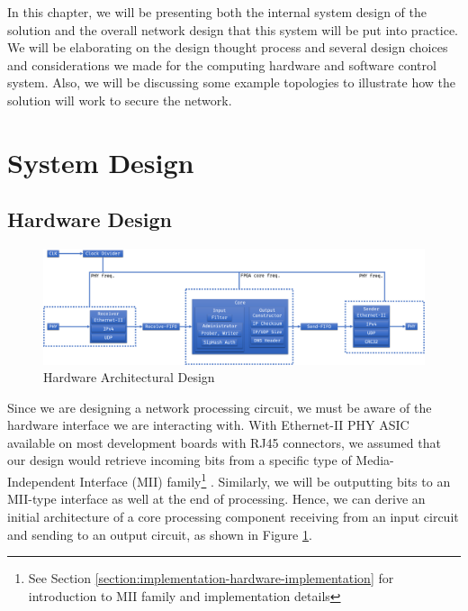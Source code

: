 \documentclass[a4paper]{report}
\begin{document}
In this chapter, we will be presenting both the internal system design of the solution and the overall network design that this system will be put into practice. We will be elaborating on the design thought process and several design choices and considerations we made for the computing hardware and software control system. Also, we will be discussing some example topologies to illustrate how the solution will work to secure the network.

\section{System Design}

\subsection{Hardware Design}
\label{section:design-system-design-hardware}

\begin{figure}[h!]
  \includegraphics[width=\textwidth]{imgs/hardware-design.png}
  \caption{Hardware Architectural Design}
  \label{fig:hardware-design}
\end{figure}

Since we are designing a network processing circuit, we must be aware of the hardware interface we are interacting with. With Ethernet-II PHY ASIC available on most development boards with RJ45 connectors, we assumed that our design would retrieve incoming bits from a specific type of Media-Independent Interface (MII) family\footnote{See Section \ref{section:implementation-hardware-implementation} for introduction to MII family and implementation details} \cite{}. Similarly, we will be outputting bits to an MII-type interface as well at the end of processing. Hence, we can derive an initial architecture of a core processing component receiving from an input circuit and sending to an output circuit, as shown in Figure \ref{fig:hardware-design}.
\end{document}
